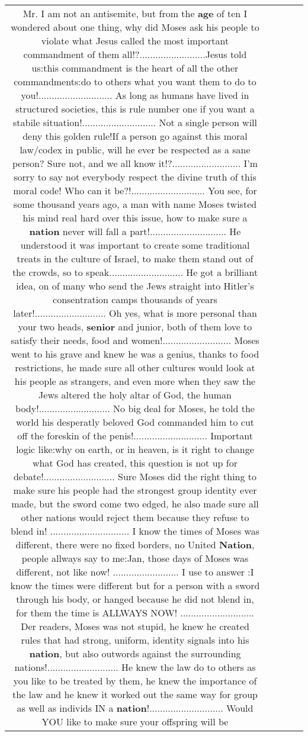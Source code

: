 \documentclass[11pt]{article}
\newlength\mylength
\begin{document}
\begin{center}
\begin{longtable}{|C{.65\mylength}|C{.30\mylength}|C{.12\mylength}|C{.12\mylength}|C{.12\mylength}|}
  \small Mr. I am not an antisemite, but from the \textbf{age} of ten I wondered about one thing, why did Moses ask his people to violate what Jesus called the most important commandment of them all!?.........................Jesus told us:this commandment is the heart of all the other commandments:do to others what you want them to do to you!............................ As long as humans have lived in structured societies, this is rule number one if you want a stabile situation!............................ Not a single person will deny this golden rule!If a person go against this moral law/codex in public, will he ever be respected as a sane person? Sure not, and we all know it!?.......................... I'm sorry to say not everybody respect the divine truth of this moral code! Who can it be?!............................ You see, for some thousand years ago, a man with name Moses twisted his mind real hard over this issue, how to make sure a \textbf{nation} never will fall a part!............................. He understood it was important to create some traditional treats in the culture of Israel, to make them stand out of the crowds, so to speak............................ He got a brilliant idea, on of many who send the Jews straight into Hitler's consentration camps thousands of years later!........................... Oh yes, what is more personal than your two heads, \textbf{senior} and junior, both of them love to satisfy their needs, food and women!.......................... Moses went to his grave and knew he was a genius, thanks to food restrictions, he made sure all other cultures would look at his people as strangers, and even more when they saw the Jews altered the holy altar of God, the human body!........................... No big deal for Moses, he told the world his desperatly beloved God commanded him to cut off the foreskin of the penis!............................ Important logic like:why on earth, or in heaven, is it right to change what God has created, this question is not up for debate!........................... Sure Moses did the right thing to make sure his people had the strongest group identity ever made, but the sword come two edged, he also made sure all other nations would reject them because they refuse to blend in! .............................. I know the times of Moses was different, there were no fixed borders, no United \textbf{Nation}, people allways say to me:Jan, those days of Moses was different, not like now! ......................... I use to answer :I know the times were different but for a person with a sword through his body, or hanged because he did not blend in, for them the time is ALLWAYS NOW! ............................ Der readers, Moses was not stupid, he knew he created rules that had strong, uniform, identity signals into his \textbf{nation}, but also outwords against the surrounding nations!........................... He knew the law do to others as you like to be treated by them, he knew the importance of the law and he knew it worked out the same way for group as well as individs IN a \textbf{nation}!............................ Would YOU like to make sure your offspring will be 
\end{longtable}
\end{center}
\end{document}
